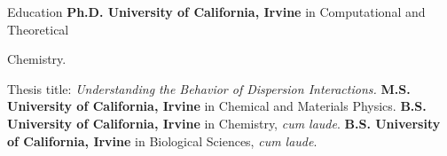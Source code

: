 \begin{rubric}{Education}
  \textbf{Ph.D. University of California, Irvine} in Computational and Theoretical

  Chemistry.
  \par Thesis title: \emph{Understanding the Behavior of Dispersion Interactions.}
%
  \textbf{M.S. University of California, Irvine} in Chemical and Materials Physics.
%
  \textbf{B.S. University of California, Irvine} in Chemistry, \textit{cum laude}.
%
  \textbf{B.S. University of California, Irvine} in Biological Sciences, \textit{cum laude}.
\end{rubric}
